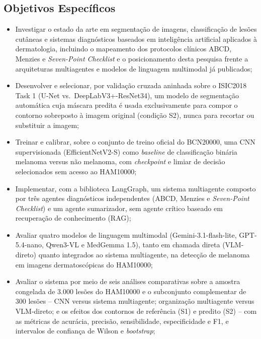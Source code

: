 \subsection{Objetivos Específicos}
\label{sec:objetivos_especificos}
\begin{itemize}
    \item Investigar o estado da arte em segmentação de imagens, classificação de lesões cutâneas e sistemas diagnósticos baseados em inteligência artificial aplicados à dermatologia, incluindo o mapeamento dos protocolos clínicos ABCD, Menzies e \textit{Seven-Point Checklist} e o posicionamento desta pesquisa frente a arquiteturas multiagentes e modelos de linguagem multimodal já publicados;

    \item Desenvolver e selecionar, por validação cruzada aninhada sobre o ISIC2018 Task 1 (U-Net vs.\ DeepLabV3+-ResNet34), um modelo de segmentação automática cuja máscara predita é usada exclusivamente para compor o contorno sobreposto à imagem original (condição S2), nunca para recortar ou substituir a imagem;

    \item Treinar e calibrar, sobre o conjunto de treino oficial do BCN20000, uma CNN supervisionada (EfficientNetV2-S) como \textit{baseline} de classificação binária melanoma versus não melanoma, com \textit{checkpoint} e limiar de decisão selecionados sem acesso ao HAM10000;

    \item Implementar, com a biblioteca LangGraph, um sistema multiagente composto por três agentes diagnósticos independentes (ABCD, Menzies e \textit{Seven-Point Checklist}) e um agente sumarizador, sem agente crítico baseado em recuperação de conhecimento (RAG);

    \item Avaliar quatro modelos de linguagem multimodal (Gemini-3.1-flash-lite, GPT-5.4-nano, Qwen3-VL e MedGemma 1.5), tanto em chamada direta (VLM-direto) quanto integrados ao sistema multiagente, na detecção de melanoma em imagens dermatoscópicas do HAM10000;

    \item Avaliar o sistema por meio de seis análises comparativas sobre a amostra congelada de 3.000 lesões do HAM10000 e o subconjunto complementar de 300 lesões -- CNN versus sistema multiagente; organização multiagente versus VLM-direto; e os efeitos dos contornos de referência (S1) e predito (S2) -- com as métricas de acurácia, precisão, sensibilidade, especificidade e F1, e intervalos de confiança de Wilson e \textit{bootstrap};


\end{itemize}
